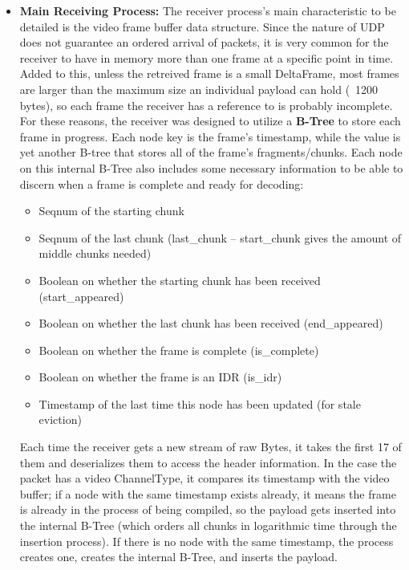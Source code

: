 \documentclass{article}
\begin{document}
\begin{itemize}
    The other process started is the main capture logic, which is explained in depth in the next chapter. The relevant aspect of it for this section is the existence of 2 MPSC channels with the network transport module as the single channel consumer. These 2 channels belong to the audio and video capture routines, and both already send the correct header plus their respective encoded data as a raw stream of the Bytes data buffer~\cite{bytes_rs}. Whenever any of the two channels contain a new data object (the payload), the channel consumer retreives this data and sends 
    to the receiver via the socket opened on the Connection Establishment step.  
    \item \textbf{Main Receiving Process:} The receiver process's main characteristic to be detailed is the video frame buffer data structure. Since the nature of UDP does not guarantee an ordered arrival of packets, it is very common for the receiver to have in memory more than one frame at a specific point in time. Added to this, unless the retreived frame is a small DeltaFrame, most frames are larger than the maximum size an individual payload can hold (~1200 bytes), so each frame the receiver has a reference to is probably incomplete. For these reasons, the receiver was designed
    to utilize a \textbf{B-Tree} to store each frame in progress. Each node key is the frame's timestamp, while the value is yet another B-tree that stores all of the frame's fragments/chunks. Each node on this internal B-Tree also includes some necessary information to be able to discern when a frame is complete and ready for decoding:
    \begin{itemize}
        \item Seqnum of the starting chunk
        \item Seqnum of the last chunk (last\_chunk -- start\_chunk gives the amount of middle chunks needed)
        \item Boolean on whether the starting chunk has been received (start\_appeared)
        \item Boolean on whether the last chunk has been received  (end\_appeared)
        \item Boolean on whether the frame is complete (is\_complete)
        \item Boolean on whether the frame is an IDR (is\_idr)
        \item Timestamp of the last time this node has been updated (for stale eviction)
    \end{itemize}
    Each time the receiver gets a new stream of raw Bytes, it takes the first 17 of them and deserializes them to access the header information. In the case the packet has a video ChannelType, it compares its timestamp with the video buffer; if a node with the same timestamp exists already, it means the frame is already in the process of being compiled, so the payload gets inserted into the internal B-Tree (which orders all chunks in logarithmic time through the insertion process). If there is no node with the same timestamp, the process creates one, creates the internal B-Tree, and inserts the payload.

\end{itemize}
\end{document}
